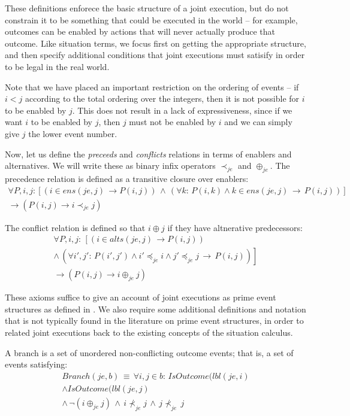 These definitions enforece the basic structure of a joint execution,
but do not constrain it to be something that could be executed in
the world -- for example, outcomes can be enabled by actions that
will never actually produce that outcome. Like situation terms, we
focus first on getting the appropriate structure, and then specify
additional conditions that joint executions must satisify in order
to be legal in the real world.

Note that we have placed an important restriction on the ordering
of events -- if $i<j$ according to the total ordering over the integers,
then it is not possible for $i$ to be enabled by $j$. This does
not result in a lack of expressiveness, since if we want $i$ to be
enabled by $j$, then $j$ must not be enabled by $i$ and we can
simply give $j$ the lower event number.

Now, let us define the \emph{preceeds} and \emph{conflicts} relations
in terms of enablers and alternatives. We will write these as binary
infix operators $\prec_{je}$ and $\oplus_{je}$. The precedence relation
is defined as a transitive closure over enablers:\begin{multline*}
\forall P,i,j:\left[\left(i\in ens(je,j)\,\rightarrow P(i,j)\right)\,\wedge\,\left(\forall k:\, P(i,k)\wedge k\in ens(je,j)\,\rightarrow\, P(i,j)\right)\right]\\
\rightarrow\left(P(i,j)\rightarrow i\prec_{je}j\right)\end{multline*}


The conflict relation is defined so that $i\oplus j$ if they have
altnerative predecessors:\begin{multline*}
\forall P,i,j:\,\left[\left(i\in alts(je,j)\,\rightarrow P(i,j)\right)\right.\\
\left.\wedge\,\left(\forall i',j':\, P(i',j')\wedge i'\preceq_{je}i\wedge j'\preceq_{je}j\,\rightarrow\, P(i,j)\right)\right]\\
\rightarrow\left(P(i,j)\rightarrow i\oplus_{je}j\right)\end{multline*}


These axioms suffice to give an account of joint executions as prime
event structures as defined in \citep{npw79event_structures}. We
also require some additional definitions and notation that is not
typically found in the literature on prime event structures, in order
to related joint executions back to the existing concepts of the situation
calculus. 

A\emph{ }branch is a set of unordered non-conflicting outcome events;
that is, a set of events satisfying:\begin{multline*}
Branch(je,b)\,\equiv\,\forall i,j\in b:\, IsOutcome(lbl(je,i)\\
\wedge IsOutcome(lbl(je,j)\\
\wedge\,\neg(i\oplus_{je}j)\,\wedge\, i\not\prec_{je}j\,\wedge\, j\not\prec_{je}\, j\end{multline*}


